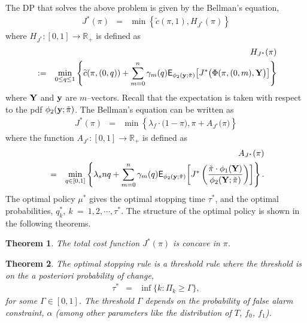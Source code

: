 \documentclass[journal]{IEEEtran}
\newcommand{\PRemPHI}{\phi_2({\bf y} ;\tilde{\pi})}
\newtheorem{theorem}{Theorem}
\newcommand{\EXPm}[1]{\mathsf{E}_{\PRemPHI}\!\left[#1\right]}
\begin{document}
The DP that solves the above problem is given by the Bellman's equation,
\begin{eqnarray*}
J^*(\pi) & = & \min\left\{\widetilde c(\pi,1), H_{J^*}(\pi)\right\}
\end{eqnarray*}
where $H_{J^*}:[0,1] \to {\mathbb R}_+$ is defined as 
{\footnotesize
\begin{eqnarray*}
& & H_{J^*}(\pi) \\
& :=&   \min_{0 \le q \le 1}\left\{ \widetilde c(\pi,(0,q))+
\sum_{m=0}^n\gamma_m(q)\EXPm{J^*\big(\Phi(\pi,(0,m),{\bf Y}\big)}\right\}
\end{eqnarray*}
}
where ${\bf Y}$ and ${\bf y}$ are $m$--vectors.
Recall that the expectation is taken with respect to the pdf $\PRemPHI$.
The Bellman's equation can be written as 
\begin{eqnarray} 
\label{eqn:DP_for_control_q_k}
J^*(\pi)  
 & = & \min\left\{\lambda_f\cdot\big(1-\pi\big),  \pi + A_{J^*}\big(\pi\big)\right\}
\end{eqnarray}
where the function $A_{J^*}:[0,1]\to\mathbb{R}_+$ is defined as
\begin{eqnarray*} 
& & A_{J^*}(\pi) \\
& = & \min_{q \in [0,1]}\left\{\lambda_snq + \sum_{m=0}^n \gamma_m(q)
\EXPm{
J^*\left(\frac{\tilde{\pi}\cdot\phi_1({\bf Y})}{\phi_2({\bf Y};\tilde{\pi})}\right) 
} \right\}. 
\end{eqnarray*}
The optimal policy $\mu^*$ gives the optimal
stopping time $\tau^*$, 
and the optimal probabilities, $q_k^*, \ k~=~1,2,\cdots,\tau^*$.
The structure of the optimal policy is shown in the following theorems.


\begin{theorem}
\label{thm:label3}
The total cost function $J^*(\pi)$ is concave in $\pi$. 
\end{theorem}

\begin{theorem}
\label{thm:policy}
The optimal stopping rule is a threshold rule where the threshold is on
the a posteriori probability of change,
\begin{eqnarray*}
\tau^* & = & \inf\{k : \Pi_k \geqslant \Gamma\},
\end{eqnarray*}
for some $\Gamma \in [0, 1]$. The threshold $\Gamma$ depends on the
probability of false alarm constraint, $\alpha$ (among other parameters
like the distribution of $T$, $f_0$, $f_1$). 
\end{theorem}
\end{document}
